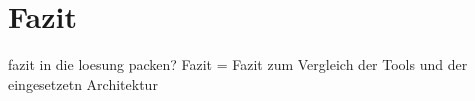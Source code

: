 \chapter{Fazit}
\label{chap:fazit}

fazit in die loesung packen? Fazit = Fazit zum Vergleich der Tools und der eingesetzetn Architektur
